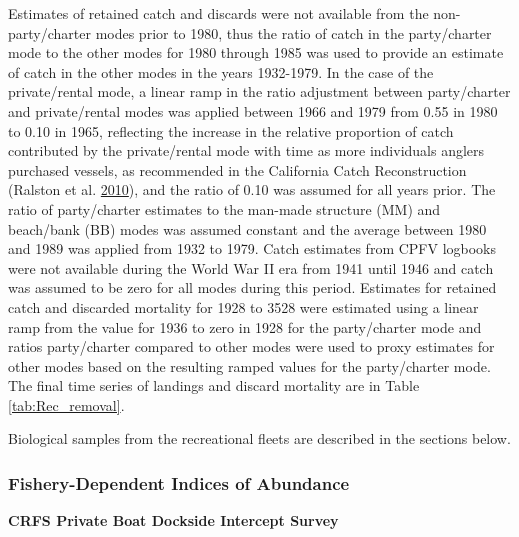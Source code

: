 \documentclass[12pt,]{article}
\begin{document}
Estimates of retained catch and discards were not available from the
non-party/charter modes prior to 1980, thus the ratio of catch in the
party/charter mode to the other modes for 1980 through 1985 was used to
provide an estimate of catch in the other modes in the years 1932-1979.
In the case of the private/rental mode, a linear ramp in the ratio
adjustment between party/charter and private/rental modes was applied
between 1966 and 1979 from 0.55 in 1980 to 0.10 in 1965, reflecting the
increase in the relative proportion of catch contributed by the
private/rental mode with time as more individuals anglers purchased
vessels, as recommended in the California Catch Reconstruction (Ralston
et al. \protect\hyperlink{ref-Ralston2010}{2010}), and the ratio of 0.10
was assumed for all years prior. The ratio of party/charter estimates to
the man-made structure (MM) and beach/bank (BB) modes was assumed
constant and the average between 1980 and 1989 was applied from 1932 to
1979. Catch estimates from CPFV logbooks were not available during the
World War II era from 1941 until 1946 and catch was assumed to be zero
for all modes during this period. Estimates for retained catch and
discarded mortality for 1928 to 3528 were estimated using a linear ramp
from the value for 1936 to zero in 1928 for the party/charter mode and
ratios party/charter compared to other modes were used to proxy
estimates for other modes based on the resulting ramped values for the
party/charter mode. The final time series of landings and discard
mortality are in Table \ref{tab:Rec_removal}.

Biological samples from the recreational fleets are described in the
sections below.

\subsubsection{Fishery-Dependent Indices of
Abundance}\label{fishery-dependent-indices-of-abundance}

\textbf{CRFS Private Boat Dockside Intercept Survey}
\end{document}

